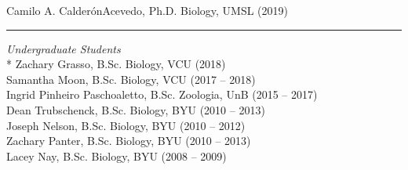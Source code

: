 \documentclass[margin,line]{res}
\begin{document}
\begin{resume}
\hspace*{8mm} Camilo A. Calder\'{o}n\textendash Acevedo, Ph.D. Biology, UMSL (2019)\\
\rule{-1mm}{5mm} \hspace*{4mm} {\textit{Undergraduate Students}}\\*
\hspace*{8mm} Zachary Grasso, B.Sc. Biology, VCU (2018)\\
\hspace*{8mm} Samantha Moon, B.Sc. Biology, VCU (2017 -- 2018)\\
\hspace*{8mm} Ingrid Pinheiro Paschoaletto, B.Sc. Zoologia, UnB (2015 -- 2017)\\
\hspace*{8mm} Dean Trubschenck, B.Sc. Biology, BYU (2010 -- 2013)\\
\hspace*{8mm} Joseph Nelson, B.Sc. Biology, BYU (2010 -- 2012)\\
\hspace*{8mm} Zachary Panter, B.Sc. Biology, BYU (2010 -- 2013)\\
\hspace*{8mm} Lacey Nay, B.Sc. Biology, BYU (2008 -- 2009)




\end{resume}
\end{document}
